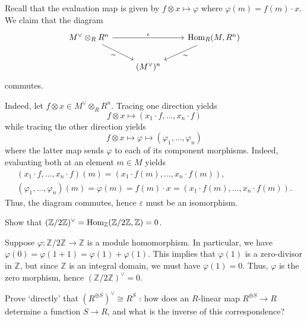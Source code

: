 \documentclass[../../master.tex]{subfiles}
\begin{document}
\begin{solution}
    Recall that the evaluation map is given by $f \otimes x \mapsto \varphi$ where $\varphi(m) = f(m) \cdot x$.
    We claim that the diagram
    \[
    \begin{tikzcd}
        M^{\vee} \otimes_R R^{n} & & \Hom_R(M, R^{n}) \\
                                 & (M^{\vee})^{n}
        \arrow[from=1-1, to=1-3, "\epsilon"]
        \arrow[from=1-1, to=2-2, "\sim"'] 
        \arrow[from=1-3, to=2-2, "\sim"] 
    \end{tikzcd}
    \]
    commutes.
    
    Indeed, let $f \otimes x \in M^{\vee} \otimes_R R^{n}$.
    Tracing one direction yields
    \[
    f \otimes x \mapsto (x_1 \cdot f, \ldots, x_n \cdot f)
    \]
    while tracing the other direction yields
    \[
    f \otimes x \mapsto \varphi \mapsto (\varphi_1, \ldots, \varphi_n)
    \]
    where the latter map sends $\varphi$ to each of its component morphisms.
    Indeed, evaluating both at an element $m \in M$ yields
    \begin{gather*}
        (x_1 \cdot f, \ldots, x_n \cdot f)(m) = (x_1 \cdot f(m), \ldots, x_n \cdot f(m)), \\
        (\varphi_1, \ldots, \varphi_n)(m) = \varphi(m) = f(m) \cdot x = (x_1 \cdot f(m), \ldots, x_n \cdot f(m)).
    \end{gather*}
        Thus, the diagram commutes, hence $\varepsilon$ must be an isomorphism.
\end{solution}

\begin{problem}
    Show that $(\mathbb{Z}/2\mathbb{Z})^{\vee} = \operatorname{Hom}_\mathbb{Z}(\mathbb{Z}/2\mathbb{Z}, \mathbb{Z}) = 0$.
\end{problem}

\begin{solution}
    Suppose $\varphi : \mathbb{Z} / 2\mathbb{Z} \to \mathbb{Z}$ is a module homomorphism.
    In particular, we have $\varphi(0) = \varphi(1 + 1) = \varphi(1) + \varphi(1)$.
    This implies that $\varphi(1)$ is a zero-divisor in $\mathbb{Z}$, but since $\mathbb{Z}$ is an integral domain, we must have $\varphi(1) = 0$.
    Thus, $\varphi$ is the zero morphism, hence $(\mathbb{Z}/2\mathbb{Z})^{\vee} = 0$.
\end{solution}

\begin{problem}
    Prove `directly' that $(R^{\oplus S})^{\vee} \cong R^{S}$ :
    how does an $R$-linear map $R^{\oplus S} \to R$ determine a function $S \to R$, and what is the inverse of this correspondence?
\end{problem}
\end{document}
